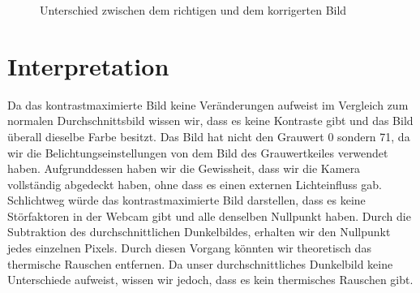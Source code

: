 \documentclass[12pt, oneside, a4paper, \docLanguage]{report}
\begin{document}
\begin{figure}[hbt!]
  	\centering
	\hfill
	\caption{Unterschied zwischen dem richtigen und dem korrigerten Bild}
\end{figure}

\newpage
\section{Interpretation}
\label{chap:VERSUCH_2_INTERPRETATION}
Da das kontrastmaximierte Bild keine Veränderungen aufweist im Vergleich zum normalen Durchschnittsbild wissen wir, dass es keine Kontraste gibt und das Bild überall dieselbe Farbe besitzt.
Das Bild hat nicht den Grauwert 0 sondern 71, da wir die Belichtungseinstellungen von dem Bild des Grauwertkeiles verwendet haben.
\newline
Aufgrunddessen haben wir die Gewissheit, dass wir die Kamera vollständig abgedeckt haben, ohne dass es einen externen Lichteinfluss gab.
Schlichtweg würde das kontrastmaximierte Bild darstellen,  dass es keine Störfaktoren in der Webcam gibt und alle denselben Nullpunkt haben.
\newline
\newline
Durch die Subtraktion des durchschnittlichen Dunkelbildes, erhalten wir den Nullpunkt jedes einzelnen Pixels. Durch diesen Vorgang könnten wir theoretisch das thermische Rauschen entfernen.
Da unser durchschnittliches Dunkelbild keine Unterschiede aufweist, wissen wir jedoch, dass es kein thermisches Rauschen gibt.
%
%
\end{document}

